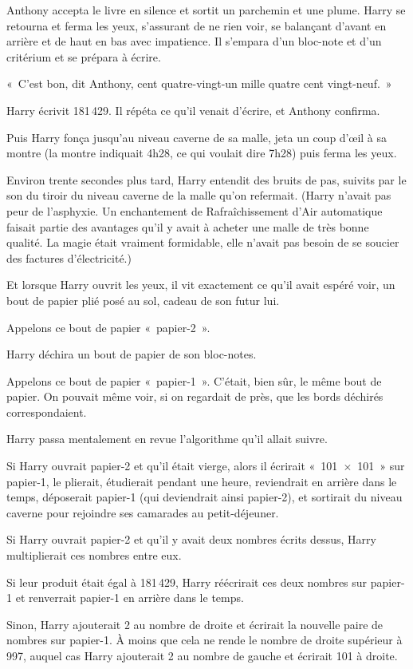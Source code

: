 Anthony accepta le livre en silence et sortit un parchemin et une plume.
Harry se retourna et ferma les yeux, s'assurant de ne rien voir, se balançant d'avant en arrière et de haut en bas avec impatience.
Il s'empara d'un bloc-note et d'un critérium et se prépara à écrire.

«~C'est bon, dit Anthony, cent quatre-vingt-un mille quatre cent vingt-neuf.~»

Harry écrivit 181\,429.
Il répéta ce qu'il venait d'écrire, et Anthony confirma.

Puis Harry fonça jusqu'au niveau caverne de sa malle, jeta un coup d'œil à sa montre (la montre indiquait 4h28, ce qui voulait dire 7h28) puis ferma les yeux.

Environ trente secondes plus tard, Harry entendit des bruits de pas, suivits par le son du tiroir du niveau caverne de la malle qu'on refermait.
(Harry n'avait pas peur de l'asphyxie.
Un enchantement de Rafraîchissement d'Air automatique faisait partie des avantages qu'il y avait à acheter une malle de très bonne qualité.
La magie était vraiment formidable, elle n'avait pas besoin de se soucier des factures d'électricité.)

Et lorsque Harry ouvrit les yeux, il vit exactement ce qu'il avait espéré voir, un bout de papier plié posé au sol, cadeau de son futur lui.

Appelons ce bout de papier «~papier-2~».

Harry déchira un bout de papier de son bloc-notes.

Appelons ce bout de papier «~papier-1~».
C'était, bien sûr, le même bout de papier.
On pouvait même voir, si on regardait de près, que les bords déchirés correspondaient.

Harry passa mentalement en revue l'algorithme qu'il allait suivre.

Si Harry ouvrait papier-2 et qu'il était vierge, alors il écrirait «~101~$\times$~101~» sur papier-1, le plierait, étudierait pendant une heure, reviendrait en arrière dans le temps, déposerait papier-1 (qui deviendrait ainsi papier-2), et sortirait du niveau caverne pour rejoindre ses camarades au petit-déjeuner.

Si Harry ouvrait papier-2 et qu'il y avait deux nombres écrits dessus, Harry multiplierait ces nombres entre eux.

Si leur produit était égal à 181\,429, Harry réécrirait ces deux nombres sur papier-1 et renverrait papier-1 en arrière dans le temps.

Sinon, Harry ajouterait 2 au nombre de droite et écrirait la nouvelle paire de nombres sur papier-1.
À moins que cela ne rende le nombre de droite supérieur à 997, auquel cas Harry ajouterait 2 au nombre de gauche et écrirait 101 à droite.

